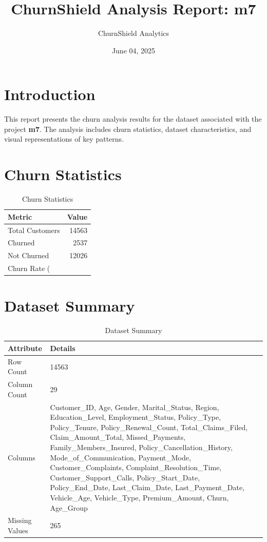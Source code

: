 \documentclass[a4paper,12pt]{article}
\begin{document}
\title{ChurnShield Analysis Report: m7}
\author{ChurnShield Analytics}
\date{ June 04, 2025 }
\maketitle

\section{Introduction}
This report presents the churn analysis results for the dataset associated with the project \textbf{m7}. The analysis includes churn statistics, dataset characteristics, and visual representations of key patterns.

\section{Churn Statistics}
\begin{table}[h]
\centering
\begin{tabular}{lr}
\toprule
Metric & Value \\
\midrule
Total Customers & 14563 \\
Churned & 2537 \\
Not Churned & 12026 \\
Churn Rate (%
\bottomrule
\end{tabular}
\caption{Churn Statistics}
\label{tab:churn_stats}
\end{table}

\section{Dataset Summary}
\begin{table}[h]
\centering
\begin{tabular}{ll}
\toprule
Attribute & Details \\
\midrule
Row Count & 14563 \\
Column Count & 29 \\
Columns & Customer_ID, Age, Gender, Marital_Status, Region, Education_Level, Employment_Status, Policy_Type, Policy_Tenure, Policy_Renewal_Count, Total_Claims_Filed, Claim_Amount_Total, Missed_Payments, Family_Members_Insured, Policy_Cancellation_History, Mode_of_Communication, Payment_Mode, Customer_Complaints, Complaint_Resolution_Time, Customer_Support_Calls, Policy_Start_Date, Policy_End_Date, Last_Claim_Date, Last_Payment_Date, Vehicle_Age, Vehicle_Type, Premium_Amount, Churn, Age_Group \\
Missing Values & 265 \\
\bottomrule
\end{tabular}
\caption{Dataset Summary}
\label{tab:dataset_summary}
\end{table}
\end{document}
